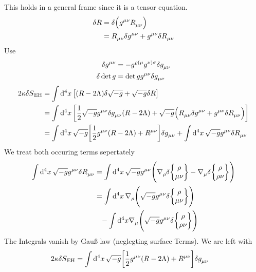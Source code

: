 This holds in a general frame since it is a tensor equation.
\begin{equation}
\begin{split}
\delta R &=\delta \left(\tensor{g}{^\mu^\nu}\tensor{R}{_\mu_\nu}\right)\\
&=\tensor{R}{_\mu_\nu}\delta\tensor{g}{^\mu^\nu}
+\tensor{g}{^\mu^\nu}\delta\tensor{R}{_\mu_\nu}\\
\end{split}
\end{equation}
Use 
\begin{align}
\delta\tensor{g}{^\mu^\nu}
&=-\tensor{g}{^\varrho^{(\mu}}\tensor{g}{^{\nu)}^\sigma}\delta\tensor{g}{_\mu_\nu}\\
\delta\det g&=\det g \tensor{g}{^\mu^\nu}\delta
\tensor{g}{_\mu_\nu}
\end{align}
\begin{equation}
\begin{split}
2\kappa\delta S\textsubscript{EH}
&=\fourint \left[
(R-2\Lambda)\delta\sqrt{-g}+\sqrt{-g}\delta R\right]\\
&=\fourint \left[
\frac{1}{2}\sqrt{-g}\tensor{g}{^\mu^\nu}\delta\tensor{g}{_\mu_\nu}
(R-2\Lambda)+\sqrt{-g}\left(\tensor{R}{_\mu_\nu}\delta\tensor{g}{^\mu^\nu}
+\tensor{g}{^\mu^\nu}\delta\tensor{R}{_\mu_\nu}\right)\right]\\
&=\fourint \sqrt{-g}\left[
\frac{1}{2}\tensor{g}{^\mu^\nu}
(R-2\Lambda)+\tensor{R}{^\mu^\nu}\right]\delta\tensor{g}{_\mu_\nu}
+\fourint \sqrt{-g}\tensor{g}{^\mu^\nu}\delta\tensor{R}{_\mu_\nu}
\\
\end{split}
\end{equation}
We treat both occuring terms sepertately
\begin{equation}
\begin{split}
\fourint \sqrt{-g}\tensor{g}{^\mu^\nu}\delta\tensor{R}{_\mu_\nu}
&=\fourint \sqrt{-g}\tensor{g}{^\mu^\nu}\left(\tensor{\nabla}{_\rho}\delta
\cSym{\rho}{\mu}{\nu} -\tensor{\nabla}{_\mu}\delta \cSym{\rho}{\rho}{\nu}\right)
\\
&=\fourint \tensor{\nabla}{_\rho}\left(\sqrt{-g}\tensor{g}{^\mu^\nu}\delta
\cSym{\rho}{\mu}{\nu}\right)\\
&\phantom{=}-\int\dif{}^4 x \tensor{\nabla}{_\mu}\left(\sqrt{-g}\tensor{g}{^\mu^\nu}\delta
\cSym{\rho}{\rho}{\nu}\right)
\end{split}
\end{equation}
The Integrals vanish by Gauß law (neglegting surface Terms). We are left with
\begin{equation}
\begin{split}
2\kappa\delta S\textsubscript{EH}
&=\fourint \sqrt{-g}\left[
\frac{1}{2}\tensor{g}{^\mu^\nu}
(R-2\Lambda)+\tensor{R}{^\mu^\nu}\right]\delta\tensor{g}{_\mu_\nu}
\end{split}
\end{equation}
